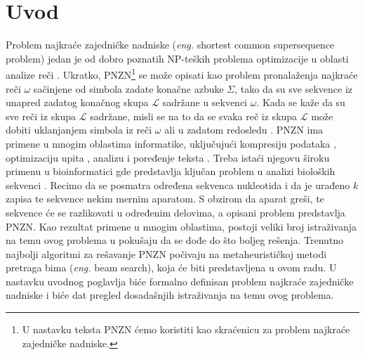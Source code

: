 \documentclass[12pt,oneside]{memoir}
\begin{document}
\frontmatter
\naslovna
\komisija
\apstrakt
\tableofcontents*

\mainmatter

\chapter{Uvod}
\label{chap:uvod}
Problem najkraće zajedničke nadniske (\textit{eng.} shortest common supersequence problem)
jedan je od dobro poznatih NP-teških problema optimizacije u oblasti analize reči \cite{ProbabilisticBS}.
Ukratko, PNZN\footnote{U nastavku teksta PNZN ćemo koristiti kao skraćenicu za problem najkraće zajedničke nadniske.}
se može opisati kao problem pronalaženja najkraće reči $\omega$ sačinjene
od simbola zadate konačne azbuke $\Sigma$, tako da su sve sekvence iz unapred zadatog konačnog skupa
$\mathcal{L}$ sadržane u sekvenci $\omega$. Kada se kaže da su sve reči iz skupa $\mathcal{L}$
sadržane, misli se na to da se svaka reč iz skupa $\mathcal{L}$ može dobiti uklanjanjem simbola iz reči $\omega$ ali 
u zadatom redosledu \cite{SCSSProblemDef}. PNZN ima primene u mnogim oblastima informatike, uključujući kompresiju podataka
\cite{DataCompression}, optimizaciju upita \cite{MQOptimization}, analizu i poređenje teksta \cite{SeqComparison, ITAlgorithms}.
Treba istaći njegovu široku primenu u bioinformatici gde predstavlja
ključan problem u analizi bioloških sekvenci \cite{SCSSBetterSolution}.
Recimo da se posmatra određena sekvenca nukleotida i da
je urađeno $k$ zapisa te sekvence nekim mernim aparatom.
S obzirom da aparat greši, te sekvence će se razlikovati u određenim
delovima, a opisani problem predstavlja PNZN.
Kao rezultat primene u mnogim oblastima, postoji veliki broj istraživanja na temu ovog problema u pokušaju da se dođe
do što boljeg rešenja. Trenutno najbolji algoritmi za rešavanje PNZN počivaju na metaheurističkoj metodi
pretraga bima (\textit{eng.} beam search), koja će biti predstavljena u ovom radu. U nastavku uvodnog poglavlja biće formalno
definisan problem najkraće zajedničke nadniske i biće dat pregled dosadašnjih istraživanja na temu ovog problema.
\end{document}
